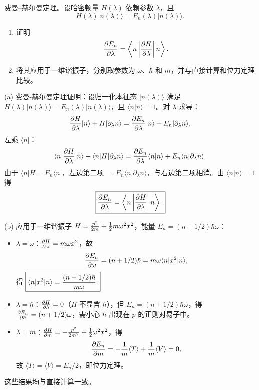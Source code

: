 \begin{question}
费曼--赫尔曼定理。设哈密顿量 $H(\lambda)$ 依赖参数 $\lambda$，且
\[
H(\lambda)|n(\lambda)\rangle=E_n(\lambda)|n(\lambda)\rangle.
\]
\begin{enumerate}
\item 证明
\[
{\partial E_n\over\partial\lambda}=\left\langle n\left|{\partial H\over\partial\lambda}\right|n\right\rangle.
\]
\item 将其应用于一维谐振子，分别取参数为 $\omega$、$\hbar$ 和 $m$，并与直接计算和位力定理比较。
\end{enumerate}
\end{question}
\begin{solution}
(a) 费曼-赫尔曼定理证明：设归一化本征态 $|n(\lambda)\rangle$ 满足 $H(\lambda)|n(\lambda)\rangle = E_n(\lambda)|n(\lambda)\rangle$，且 $\langle n|n\rangle=1$。对 $\lambda$ 求导：
\[
{\partial H\over\partial\lambda}|n\rangle + H|\partial_\lambda n\rangle
= {\partial E_n\over\partial\lambda}|n\rangle + E_n|\partial_\lambda n\rangle.
\]
左乘 $\langle n|$：
\[
\langle n|{\partial H\over\partial\lambda}|n\rangle + \langle n|H|\partial_\lambda n\rangle
= {\partial E_n\over\partial\lambda}\langle n|n\rangle + E_n\langle n|\partial_\lambda n\rangle.
\]
由于 $\langle n|H = E_n\langle n|$，左边第二项 $=E_n\langle n|\partial_\lambda n\rangle$，与右边第二项相消。由 $\langle n|n\rangle=1$ 得
\[
\boxed{{\partial E_n\over\partial\lambda} = \left\langle n\left|{\partial H\over\partial\lambda}\right|n\right\rangle.}
\]

(b) 应用于一维谐振子 $H={p^2\over2m}+{1\over2}m\omega^2x^2$，能量 $E_n=(n+1/2)\hbar\omega$：
\begin{itemize}
\item $\lambda=\omega$：${\partial H\over\partial\omega}=m\omega x^2$，故
  \[
  {\partial E_n\over\partial\omega} = (n+1/2)\hbar = m\omega\langle n|x^2|n\rangle,
  \]
  得 $\boxed{\langle n|x^2|n\rangle = {(n+1/2)\hbar\over m\omega}.}$
\item $\lambda=\hbar$：${\partial H\over\partial\hbar}=0$（$H$ 不显含 $\hbar$），但 $E_n=(n+1/2)\hbar\omega$，得 ${\partial E_n\over\partial\hbar}=(n+1/2)\omega$，需小心 $\hbar$ 出现在 $p$ 的正则对易子中。
\item $\lambda=m$：${\partial H\over\partial m} = -{p^2\over2m^2} + {1\over2}\omega^2 x^2$，得
  \[
  {\partial E_n\over\partial m} = -{1\over m}\langle T\rangle + {1\over m}\langle V\rangle = 0,
  \]
  故 $\langle T\rangle = \langle V\rangle = E_n/2$，即位力定理。
\end{itemize}
这些结果均与直接计算一致。
\end{solution}

